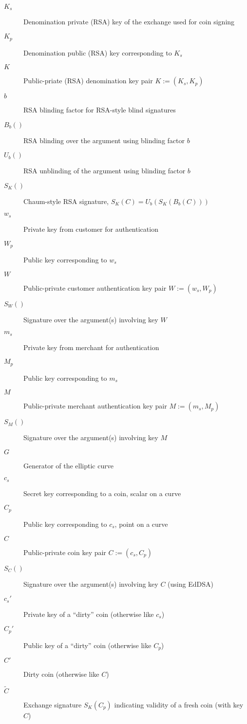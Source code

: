 \documentclass{llncs}
\begin{document}
\begin{description}
  \item[$K_s$]{Denomination private (RSA) key of the exchange used for coin signing}
  \item[$K_p$]{Denomination public (RSA) key corresponding to $K_s$}
  \item[$K$]{Public-priate (RSA) denomination key pair $K := (K_s, K_p)$}
  \item[$b$]{RSA blinding factor for RSA-style blind signatures}
  \item[$B_b()$]{RSA blinding over the argument using blinding factor $b$}
  \item[$U_b()$]{RSA unblinding of the argument using blinding factor $b$}
  \item[$S_K()$]{Chaum-style RSA signature, $S_K(C) = U_b(S_K(B_b(C)))$}
  \item[$w_s$]{Private key from customer for authentication}
  \item[$W_p$]{Public key corresponding to $w_s$}
  \item[$W$]{Public-private customer authentication key pair $W := (w_s, W_p)$}
  \item[$S_W()$]{Signature over the argument(s) involving key $W$}
  \item[$m_s$]{Private key from merchant for authentication}
  \item[$M_p$]{Public key corresponding to $m_s$}
  \item[$M$]{Public-private merchant authentication key pair $M := (m_s, M_p)$}
  \item[$S_M()$]{Signature over the argument(s) involving key $M$}
  \item[$G$]{Generator of the elliptic curve}
  \item[$c_s$]{Secret key corresponding to a coin, scalar on a curve}
  \item[$C_p$]{Public key corresponding to $c_s$, point on a curve}
  \item[$C$]{Public-private coin key pair $C := (c_s, C_p)$}
  \item[$S_{C}()$]{Signature over the argument(s) involving key $C$ (using EdDSA)}
  \item[$c_s'$]{Private key of a ``dirty'' coin (otherwise like $c_s$)}
  \item[$C_p'$]{Public key of a ``dirty'' coin (otherwise like $C_p$)}
  \item[$C'$]{Dirty coin (otherwise like $C$)}
  \item[$\widetilde{C}$]{Exchange signature $S_K(C_p)$ indicating validity of a fresh coin (with key $C$)}

\end{description}
\end{document}
